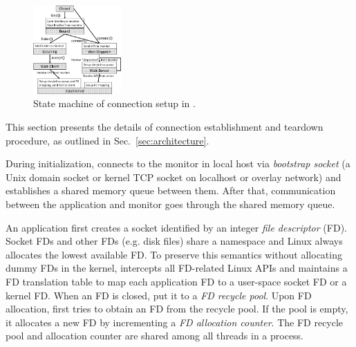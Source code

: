 

\begin{figure}[t!]
	\centering
	\includegraphics[width=0.3\textwidth]{images/conn-setup-new}
	\vspace{-5pt}
	\caption{State machine of connection setup in \libipc{}.}
	\label{fig:conn-setup}
\end{figure}


This section presents the details of connection establishment and teardown procedure, as outlined in Sec.~\ref{sec:architecture}.

During initialization, \libipc{} connects to the monitor in local host via \emph{bootstrap socket} (a Unix domain socket or kernel TCP socket on localhost or overlay network) and establishes a shared memory queue between them.
After that, communication between the application and monitor goes through the shared memory queue.


An application first creates a socket identified by an integer \emph{file descriptor} (FD).
Socket FDs and other FDs (e.g. disk files) share a namespace and Linux always allocates the lowest available FD.
To preserve this semantics without allocating dummy FDs in the kernel, \libipc{} intercepts all FD-related Linux APIs and maintains a FD translation table to map each application FD to a user-space socket FD or a kernel FD.
When an FD is closed, \libipc{} put it to a \emph{FD recycle pool}.
Upon FD allocation, \libipc{} first tries to obtain an FD from the recycle pool.
If the pool is empty, it allocates a new FD by incrementing a \emph{FD allocation counter}.
The FD recycle pool and allocation counter are shared among all threads in a process.%

